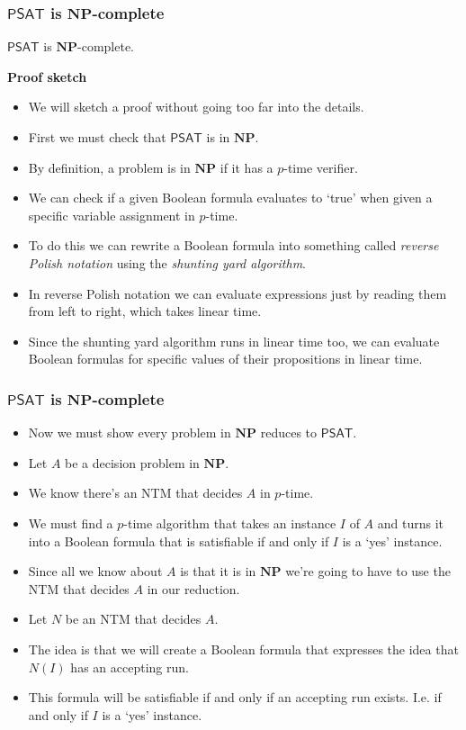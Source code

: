 \documentclass[handout]{beamer}
\newcommand{\NP}{\mathbf{NP}}
\newcommand{\SAT}{\mathsf{PSAT}}
\begin{document}
\begin{frame}
\frametitle{$\SAT$ is $\NP$-complete}

\begin{theorem}
$\SAT$ is $\NP$-complete.
\end{theorem}
\textbf{Proof sketch}
\begin{itemize}
\item We will sketch a proof without going too far into the details. 
\item First we must check that $\SAT$ is in $\NP$.
\item By definition, a problem is in $\NP$ if it has a $p$-time verifier. 
\item We can check if a given Boolean formula evaluates to `true' when given a specific variable assignment in $p$-time. 
\item To do this we can rewrite a Boolean formula into something called \emph{reverse Polish notation} using the \emph{shunting yard algorithm}. 
\item In reverse Polish notation we can evaluate expressions just by reading them from left to right, which takes linear time. 
\item Since the shunting yard algorithm runs in linear time too, we can evaluate Boolean formulas for specific values of their propositions in linear time.
\end{itemize} 
\end{frame}

\begin{frame}
\frametitle{$\SAT$ is $\NP$-complete}
\begin{itemize}
\item Now we must show every problem in $\NP$ reduces to $\SAT$.
\vspace{0.2cm}
\item Let $A$ be a decision problem in $\NP$. 
\vspace{0.2cm}
\item We know there's an NTM that decides $A$ in $p$-time. 
\vspace{0.2cm}
\item We must find a $p$-time algorithm that takes an instance $I$ of $A$ and turns it into a Boolean formula that is satisfiable if and only if $I$ is a `yes' instance. 
\vspace{0.2cm}
\item Since all we know about $A$ is that it is in $\NP$ we're going to have to use the NTM that decides $A$ in our reduction. 
\vspace{0.2cm}
\item Let $N$ be an NTM that decides $A$. 
\vspace{0.2cm}
\item The idea is that we will create a Boolean formula that expresses the idea that $N(I)$ has an accepting run. 
\vspace{0.2cm}
\item This formula will be satisfiable if and only if an accepting run exists. I.e. if and only if $I$ is a `yes' instance.
\end{itemize} 
\end{frame}
\end{document}
